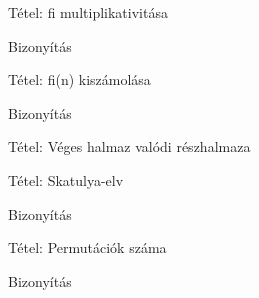 \documentclass{beamer}
\begin{document}
\begin{frame}

\begin{block}{Tétel: fi multiplikativitása}
\end{block}

\begin{block}{Bizonyítás}
\end{block}

\end{frame}

\begin{frame}

\begin{block}{Tétel: fi(n) kiszámolása}
\end{block}

\begin{block}{Bizonyítás}
\end{block}

\end{frame}

\begin{frame}[plain]
\end{frame}

\begin{frame}

\begin{block}{Tétel: Véges halmaz valódi részhalmaza}
\end{block}

\end{frame}

\begin{frame}

\begin{block}{Tétel: Skatulya-elv}
\end{block}

\begin{block}{Bizonyítás}
\end{block}

\end{frame}

\begin{frame}

\begin{block}{Tétel: Permutációk száma}
\end{block}

\begin{block}{Bizonyítás}
\end{block}

\end{frame}
\end{document}
